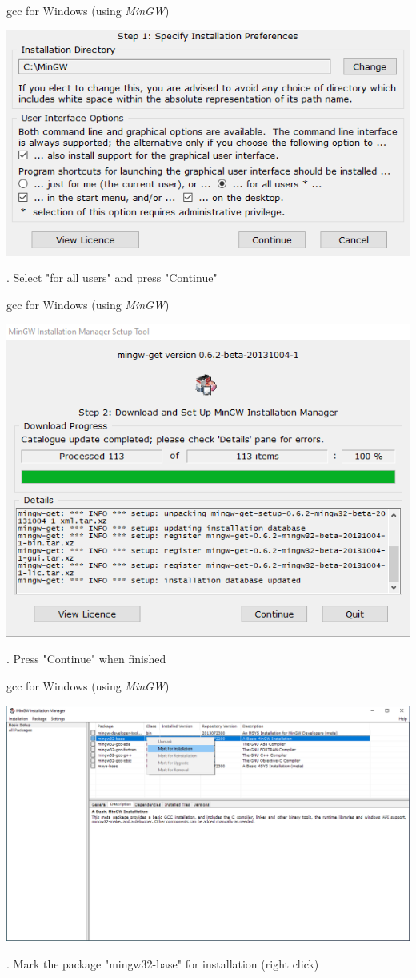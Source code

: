 \begin{frame}{gcc for Windows (using \textit{MinGW})}
	\centerline{\includegraphics[scale=.5]{../img/install/mingw/settings.png}}
	. Select "for all users" and press "Continue"
\end{frame}

\begin{frame}{gcc for Windows (using \textit{MinGW})}
	\centerline{\includegraphics[scale=.45]{../img/install/mingw/finish.png}}
	. Press "Continue" when finished
\end{frame}

\begin{frame}{gcc for Windows (using \textit{MinGW})}
	\centerline{\includegraphics[scale=.3]{../img/install/mingw/mark.png}}
	. Mark the package "mingw32-base" for installation (right click)
\end{frame}

